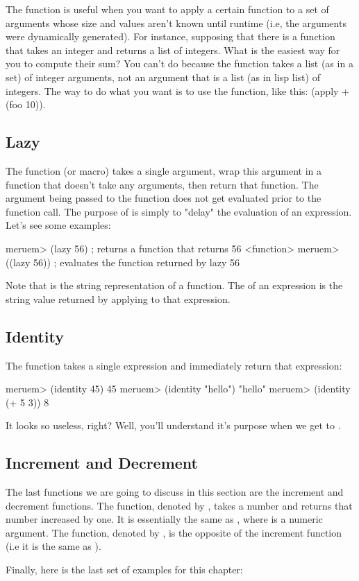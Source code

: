 The  function is useful when you want to apply a certain function to a set of arguments whose size and values aren't known until runtime (i.e, the arguments were dynamically generated). For instance, supposing that there is a function  that takes an integer and returns a list of integers. What is the easiest way for you to compute their sum? You can't do  because the \code{+} function takes a list (as in a set) of integer arguments, not an argument that is a list (as in lisp list)  of integers. The way to do what you want is to use the  function, like this: (apply + (foo 10)).

\subsection{Lazy}
The  function (or macro) takes a single argument, wrap this argument in a function that doesn't take any arguments, then return that function. The argument being passed to the  function does not get evaluated prior to the function call. The purpose of  is simply to "delay" the evaluation of an expression. Let's see some examples:

\begin{REPL}
meruem> (lazy 56)  ; returns a function that returns 56
<function>
meruem> ((lazy 56))  ; evaluates the function returned by lazy
56
\end{REPL}

Note that  is the string representation of a function. The  of an expression is the string value returned by applying  to that expression.

\subsection{Identity}
The  function takes a single expression and immediately return that expression:

\begin{REPL}
meruem> (identity 45)
45
meruem> (identity "hello")
"hello"
meruem> (identity (+ 5 3))
8
\end{REPL}

It looks so useless, right? Well, you'll understand it's purpose when we get to .

\subsection{Increment and Decrement}
The last functions we are going to discuss in this section are the increment and decrement functions. The  function, denoted by , takes a number and returns that number increased by one. It is essentially the same as , where  is a numeric argument. The  function, denoted by , is the opposite of the increment function (i.e it is the same as ). 


Finally, here is the last set of examples for this chapter:

\begin{REPL}
meruem> (inc 67)
68
meruem> (dec 30)
29
meruem> (inc 9.8)
10.8
meruem> (inc \a)
An error has occurred. Invalid Type. Not a Number: a
Source: .home.melvic.meruem.meruem.prelude [1:6}]
(inc \a)
     ^
\end{REPL}